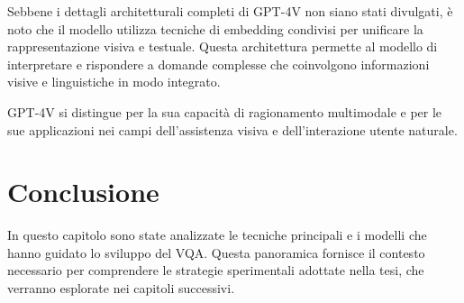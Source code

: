 \documentclass[../main.tex]{subfiles}
\begin{document}
Sebbene i dettagli architetturali completi di GPT-4V non siano stati divulgati, è noto che il modello utilizza tecniche di embedding condivisi per unificare la rappresentazione visiva e testuale. Questa architettura permette al modello di interpretare e rispondere a domande complesse che coinvolgono informazioni visive e linguistiche in modo integrato.

GPT-4V si distingue per la sua capacità di ragionamento multimodale e per le sue applicazioni nei campi dell'assistenza visiva e dell'interazione utente naturale.

\section{Conclusione}

In questo capitolo sono state analizzate le tecniche principali e i modelli che hanno guidato lo sviluppo del VQA. 
Questa panoramica fornisce il contesto necessario per comprendere le strategie sperimentali adottate nella tesi, che verranno esplorate nei capitoli successivi.
\end{document}
